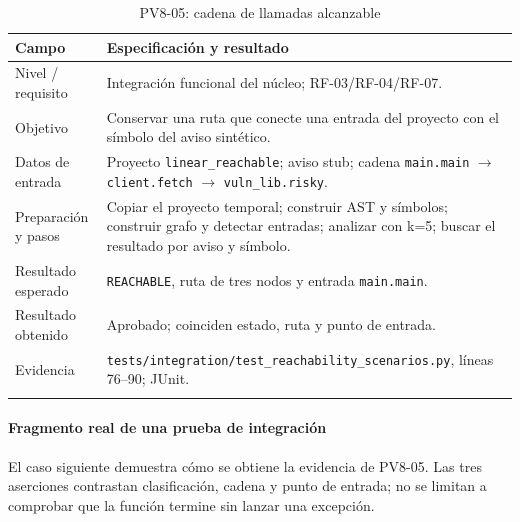 \begin{table}[H]
\centering\small{}
\caption{PV8-05: cadena de llamadas alcanzable}
\begin{tabularx}{\textwidth}{P{3.5cm}Y}
\toprule
\textbf{Campo} & \textbf{Especificación y resultado} \\
\midrule
Nivel / requisito & Integración funcional del núcleo; RF-03/RF-04/RF-07. \\
\addlinespace
Objetivo & Conservar una ruta que conecte una entrada del proyecto con el símbolo del aviso sintético. \\
\addlinespace
Datos de entrada & Proyecto \texttt{linear\_\allowbreak reachable}; aviso stub; cadena \texttt{main.\allowbreak main} $\rightarrow$ \texttt{client.\allowbreak fetch} $\rightarrow$ \texttt{vuln\_\allowbreak lib.\allowbreak risky}. \\
\addlinespace
Preparación y pasos & Copiar el proyecto temporal; construir AST y símbolos; construir grafo y detectar entradas; analizar con k=5; buscar el resultado por aviso y símbolo. \\
\addlinespace
Resultado esperado & \texttt{REACHABLE}, ruta de tres nodos y entrada \texttt{main.\allowbreak main}. \\
\addlinespace
Resultado obtenido & Aprobado; coinciden estado, ruta y punto de entrada. \\
\addlinespace
Evidencia & \texttt{tests/\allowbreak integration/\allowbreak test\_\allowbreak reachability\_\allowbreak scenarios.\allowbreak py}, líneas 76--90; JUnit. \\
\addlinespace
\bottomrule
\end{tabularx}
\end{table}
\paragraph*{Fragmento real de una prueba de integración}
El caso siguiente demuestra cómo se obtiene la evidencia de PV8-05. Las tres aserciones contrastan clasificación, cadena y punto de entrada; no se limitan a comprobar que la función termine sin lanzar una excepción.
\par\begingroup{}
\noindent\begin{minipage}{\textwidth}

\end{minipage}
\endgroup
{}
